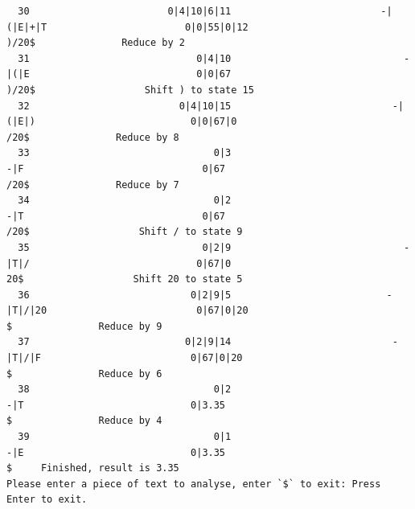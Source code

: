 \documentclass[UTF8]{ctexart}
\begin{document}
\begin{lstlisting}
  30                        0|4|10|6|11                          -|(|E|+|T                        0|0|55|0|12                              )/20$               Reduce by 2
  31                             0|4|10                              -|(|E                             0|0|67                              )/20$                   Shift ) to state 15
  32                          0|4|10|15                            -|(|E|)                           0|0|67|0                               /20$               Reduce by 8
  33                                0|3                                -|F                               0|67                               /20$               Reduce by 7
  34                                0|2                                -|T                               0|67                               /20$                   Shift / to state 9
  35                              0|2|9                              -|T|/                             0|67|0                                20$                   Shift 20 to state 5
  36                            0|2|9|5                           -|T|/|20                          0|67|0|20                                  $               Reduce by 9
  37                           0|2|9|14                            -|T|/|F                          0|67|0|20                                  $               Reduce by 6
  38                                0|2                                -|T                             0|3.35                                  $               Reduce by 4
  39                                0|1                                -|E                             0|3.35                                  $     Finished, result is 3.35
Please enter a piece of text to analyse, enter `$` to exit: Press Enter to exit.
    \end{lstlisting}
\end{document}
